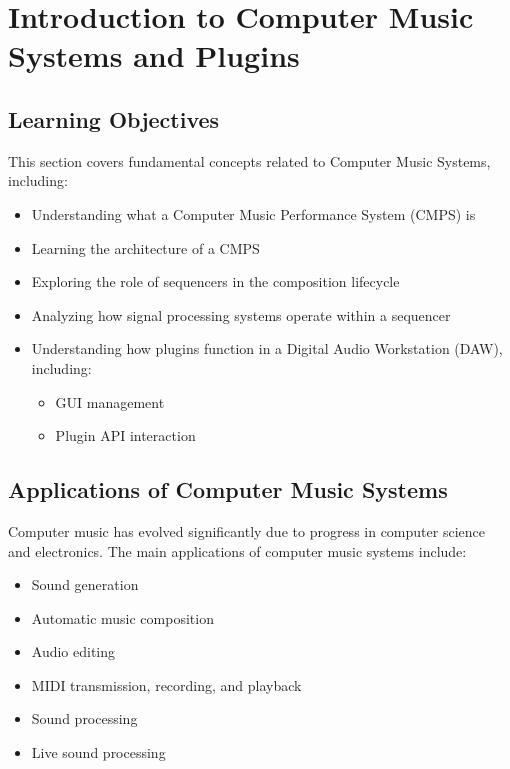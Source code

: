 
\chapter{Introduction to Computer Music Systems and Plugins}

\section{Learning Objectives}

This section covers fundamental concepts related to Computer Music Systems, including:

\begin{itemize}
    \item Understanding what a Computer Music Performance System (CMPS) is
    \item Learning the architecture of a CMPS
    \item Exploring the role of sequencers in the composition lifecycle
    \item Analyzing how signal processing systems operate within a sequencer
    \item Understanding how plugins function in a Digital Audio Workstation (DAW), including:
    \begin{itemize}
        \item GUI management
        \item Plugin API interaction
    \end{itemize}
\end{itemize}

\section{Applications of Computer Music Systems}

Computer music has evolved significantly due to progress in computer science and electronics. The main applications of computer music systems include:

\begin{itemize}
    \item Sound generation
    \item Automatic music composition
    \item Audio editing
    \item MIDI transmission, recording, and playback
    \item Sound processing
    \item Live sound processing
\end{itemize}

